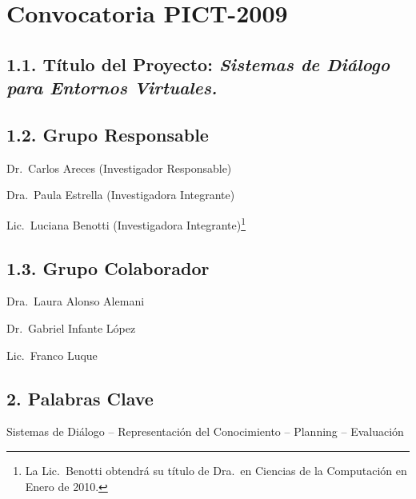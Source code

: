 \documentclass[11pt]{article}
\newcommand{\MySubSection}[1]{\vspace*{-.1\baselineskip}%
\subsection*{\sffamily\textbf
#1}\vspace*{-.2\baselineskip}}
\begin{document}
%
\thispagestyle{plain}

\section*{\sffamily\textbf{Convocatoria PICT-2009}}
\mbox{}

\vspace*{-.5\baselineskip}
\MySubSection{1.1. T\'itulo del Proyecto:
{\rm \emph{\Large Sistemas de Di\'alogo para Entornos Virtuales.}}}

\MySubSection{1.2. Grupo Responsable}

\hspace*{.5cm} Dr.\ Carlos Areces (Investigador Responsable)

Dra.\ Paula Estrella (Investigadora Integrante)

Lic.\ Luciana Benotti (Investigadora Integrante)\footnote{La Lic.\ Benotti
obtendr\'a su t\'itulo de Dra.\ en Ciencias de la Computaci\'on en Enero de 2010.}

\MySubSection{1.3. Grupo Colaborador}

\hspace*{.5cm}
Dra.\ Laura Alonso Alemani

Dr.\ Gabriel Infante L\'opez

Lic.\ Franco Luque

\MySubSection{2.  Palabras Clave}

Sistemas de Di\'alogo -- Representaci\'on del Conocimiento -- Planning
-- Evaluaci\'on




\end{document}
